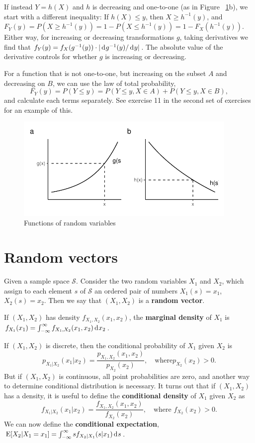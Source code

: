 \documentclass[10pt]{article}
\begin{document}
If instead $Y=h(X)$ and $h$ is decreasing and one-to-one (as in Figure ~\ref{fig:frv}b), we
start with a different inequality: If $h(X) \leq y$, then $X\geq h^{-1}(y)$,
and $F_Y(y) = P(X\geq h^{-1}(y)) = 1 - P(X\leq h^{-1}(y)) = 1 - F_X(h^{-1}(y))$.
Either way, for increasing or decreasing transformations $g$, taking derivatives we find that 
$f_Y(y) = f_X(g^{-1}(y)) \cdot | \rd g^{-1}(y)/\rd y|$.
The absolute value of the derivative controls for whether $g$ is increasing or decreasing.

For a function that is not one-to-one, but increasing on the subset 
$A$ and decreasing on $B$, we can use the
law of total probability, \[F_Y(y) = P(Y\leq y)= P(Y\leq y , X\in A) + P(Y\leq y , X\in B),\] and 
calculate each terms separately. See exercise 11 in the second
set of exercises for an example of this.

\begin{figure}[tb]
\includegraphics[width=0.95\textwidth]{../graphs/transformation_of_RV}

\caption{Functions of random variables}\label{fig:frv}
\end{figure}



\section{Random vectors}
Given a sample space $\mathcal{S}$. Consider the
two random variables $X_1$ and $X_2$, which assign to each element
$s$ of $\mathcal{S}$ an ordered pair of numbers
$X_1(s)=x_1$, $X_2(s)=x_2$. Then we say that $(X_1,X_2)$ is a
\textbf{random vector}. 

If $(X_1,X_2)$ has density $f_{X_1,X_2}(x_1,x_2)$, the \textbf{marginal density}
of $X_1$ is  $ f_{X_1}(x_1) = \int_{-\infty}^\infty f_{X_1,X_2}(x_1,x_2)\rd x_2$.

If $(X_1,X_2)$ is discrete, then the conditional probability of $X_1$ given $X_2$ is
\[ p_{X_1|X_2}(x_1|x_2) = \frac{p_{X_1,X_2}(x_1,x_2)}{p_{X_2}(x_2)}, \quad \text{where
$p_{X_2}(x_2)>0$}.\] But if $(X_1,X_2)$ is continuous, all point probabilities are
zero, and another way to determine conditional distribution is necessary. It
turns out that if $(X_1,X_2)$ has a density, it is useful to define the
\textbf{conditional density} of $X_1$ given $X_2$ as
\[f_{X_1|X_2}(x_1|x_2)=\frac{f_{X_1,X_2}(x_1,x_2)}{f_{X_2}(x_2)},\quad \text{where $f_{X_2}(x_2)>0$}.\]
We can now define
the \textbf{conditional expectation}, $\E[X_2|X_1=x_1] = \int_{-\infty}^\infty s
f_{X_2|X_1}(s|x_1) \rd s$.
\end{document}

